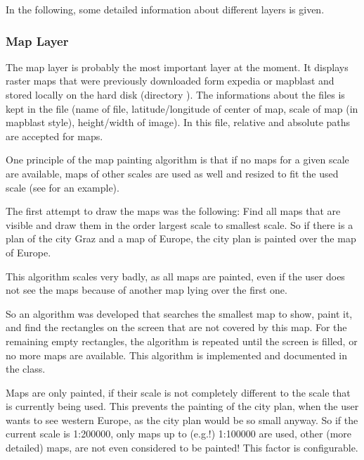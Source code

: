 \documentclass[a4paper]{article} %
\begin{document}
In the following, some detailed information about different layers is
given.

\subsubsection{Map Layer}
\label{SoftwareDesignOfTheGpstoolPackage-Map-Layer}

The map layer is probably the most important layer at the moment. It
displays raster maps that were previously downloaded form expedia or
mapblast and stored locally on the hard disk (directory
). The informations about the files is kept
in the file  (name of file,
latitude/longitude of center of map, scale of map (in mapblast style),
height/width of image). In this file, relative and absolute paths are
accepted for maps.

One principle of the map painting algorithm is that if no maps for a
given scale are available, maps of other scales are used as well and
resized to fit the used scale (see
for an example).


The first attempt to draw the maps was the following: Find all maps
that are visible and draw them in the order largest scale to smallest
scale. So if there is a plan of the city Graz and a map of Europe, the
city plan is painted over the map of Europe.

This algorithm scales very badly, as all maps are painted, even if the
user does not see the maps because of another map lying over the first
one.

So an algorithm was developed that searches the smallest map to show,
paint it, and find the rectangles on the screen that are not covered
by this map. For the remaining empty rectangles, the algorithm is
repeated until the screen is filled, or no more maps are
available. This algorithm is implemented and documented in the
 class.

Maps are only painted, if their scale is not completely different to
the scale that is currently being used. This prevents the painting of
the city plan, when the user wants to see western Europe, as the city
plan would be so small anyway. So if the current scale is 1:200000,
only maps up to (e.g.!) 1:100000 are used, other (more detailed) maps,
are not even considered to be painted! This factor is configurable.
\end{document}
